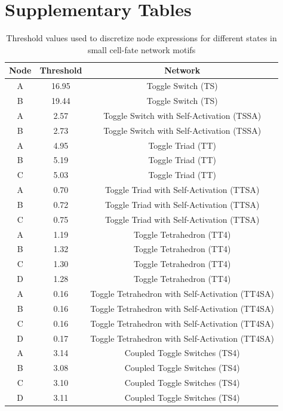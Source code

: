 \section{Supplementary Tables}

\begin{table}[!ht]
\centering
\caption{\normalsize{Threshold values used to discretize node expressions for different states in small cell-fate network motifs}}
\label{tb:Thresholds}
\begin{tabular}{|c|c|c|}
    \hline
    \textbf{Node} &  \textbf{Threshold} & \textbf{Network}\\
    \hline\hline
    A & 16.95 & Toggle Switch (TS)\\
    \hline
    B & 19.44 & Toggle Switch (TS)\\
    \hline
    A & 2.57 & Toggle Switch with Self-Activation (TSSA)\\
    \hline
    B & 2.73 & Toggle Switch with Self-Activation (TSSA)\\
    \hline
    A & 4.95 & Toggle Triad (TT)\\
    \hline
    B & 5.19 & Toggle Triad (TT)\\
    \hline
    C & 5.03 & Toggle Triad (TT)\\
    \hline
    A & 0.70 & Toggle Triad with Self-Activation (TTSA)\\
    \hline
    B & 0.72 & Toggle Triad with Self-Activation (TTSA)\\
    \hline
    C & 0.75 & Toggle Triad with Self-Activation (TTSA)\\
    \hline
    A & 1.19 & Toggle Tetrahedron (TT4)\\
    \hline
    B & 1.32 & Toggle Tetrahedron (TT4)\\
    \hline
    C & 1.30 & Toggle Tetrahedron (TT4)\\
    \hline
    D & 1.28 & Toggle Tetrahedron (TT4)\\
    \hline
    A & 0.16 & Toggle Tetrahedron with Self-Activation (TT4SA)\\
    \hline
    B & 0.16 & Toggle Tetrahedron with Self-Activation (TT4SA)\\
    \hline
    C & 0.16 & Toggle Tetrahedron with Self-Activation (TT4SA)\\
    \hline
    D & 0.17 & Toggle Tetrahedron with Self-Activation (TT4SA)\\
    \hline
    A & 3.14 & Coupled Toggle Switches (TS4)\\
    \hline
    B & 3.08 & Coupled Toggle Switches (TS4)\\
    \hline
    C & 3.10 & Coupled Toggle Switches (TS4)\\
    \hline
    D & 3.11 & Coupled Toggle Switches (TS4)\\
    \hline
\end{tabular}
\end{table}


